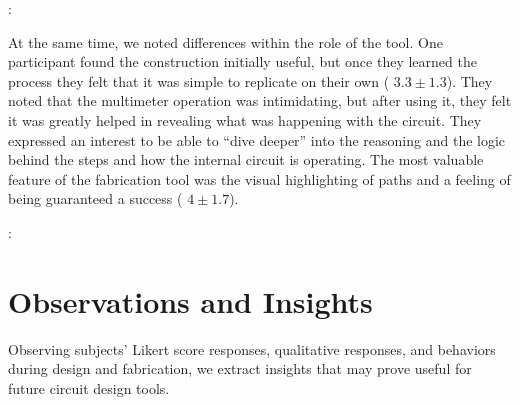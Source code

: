 \documentclass{sigchi}
\begin{document}
  \begin{myquote}
   \vspace{-2pt}
    :
    \vspace{-2pt}
  \end{myquote}

  At the same time, we noted differences within the role of the tool. One participant found the construction initially useful, but once they learned the process they felt that it was simple to replicate on their own ( $3.3 \pm 1.3$).   They noted that the multimeter operation was intimidating, but after using it, they felt it was greatly helped in revealing what was happening with the circuit. They expressed an interest to be able to ``dive deeper'' into the reasoning and the logic behind the steps and how the internal circuit is operating. The most valuable feature of the fabrication tool was the visual highlighting of paths and a feeling of being guaranteed a success ( $4 \pm 1.7$). 

  \begin{myquote}
   \vspace{-2pt}
    :
    \vspace{-2pt}
  \end{myquote}




% 
  
  

\section{Observations and Insights}
  Observing subjects' Likert score responses, qualitative responses, and behaviors during design and fabrication, we extract insights that may prove useful for future circuit design tools.
  
\end{document}
